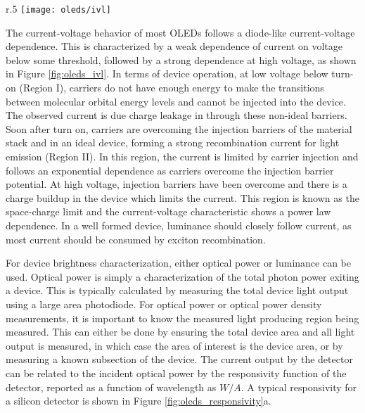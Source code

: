 \documentclass[../thesis.tex]{subfiles}
\begin{document}
\begin{wrapfigure}{r}{.5\textwidth}
    \centering
    \texttt{[image: oleds/ivl]}
    \caption{a. Device current voltage  and luminance voltage behavior}
    \label{fig:oleds_ivl}\par\vfill
\end{wrapfigure}

The current-voltage behavior of most OLEDs follows a diode-like current-voltage dependence.
This is characterized by a weak dependence of current on voltage below some threshold, followed by a strong dependence at high voltage, as shown in Figure \ref{fig:oleds_ivl}.
In terms of device operation, at low voltage below turn-on (Region I), carriers do not have enough energy to make the transitions between molecular orbital energy levels and cannot be injected into the device.
The observed current is due charge leakage in through these non-ideal barriers.
Soon after turn on, carriers are overcoming the injection barriers of the material stack and in an ideal device, forming a strong recombination current for light emission (Region II).
In this region, the current is limited by carrier injection and follows an exponential dependence as carriers overcome the injection barrier potential.\supercite{Pope1999}
At high voltage, injection barriers have been overcome and there is a charge buildup in the device which limits the current.
This region is known as the space-charge limit and the current-voltage characteristic shows a power law dependence.\supercite{Pope1999,Mark1962,Lampert2002a}
In a well formed device, luminance should closely follow current, as most current should be consumed by exciton recombination.


For device brightness characterization, either optical power or luminance can be used.
Optical power is simply a characterization of the total photon power exiting a device.
This is typically calculated by measuring the total device light output using a large area photodiode.
For optical power or optical power density measurements, it is important to know the measured light producing region being measured.
This can either be done by ensuring the total device area and all light output is measured, in which case the area of interest is the device area, or by measuring a known subsection of the device.
The current output by the detector can be related to the incident optical power by the responsivity function of the detector, reported as a function of wavelength as $W/A$.
A typical responsivity for a silicon detector is shown in Figure \ref{fig:oleds_responsivity}a.
\end{document}
